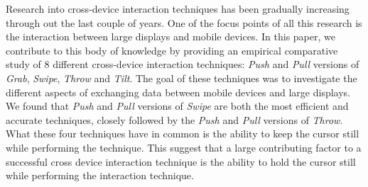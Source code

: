 
Research into cross-device interaction techniques has been gradually increasing through out the last couple of years. 
One of the focus points of all this research is the interaction between large displays and mobile devices.
In this paper, we contribute to this body of knowledge by providing an empirical comparative study of 8 different cross-device interaction techniques: \emph{Push} and \emph{Pull} versions of \textit{Grab}, \textit{Swipe}, \textit{Throw} and \textit{Tilt}.
The goal of these techniques was to investigate the different aspects of exchanging data between mobile devices and large displays. 
We found that \emph{Push} and \emph{Pull} versions of \textit{Swipe} are both the most efficient and accurate techniques, closely followed by the \emph{Push} and \emph{Pull} versions of \textit{Throw}.
What these four techniques have in common is the ability to keep the cursor still while performing the technique.
This suggest that a large contributing factor to a successful cross device interaction technique is the ability to hold the cursor still while performing the interaction technique. 
